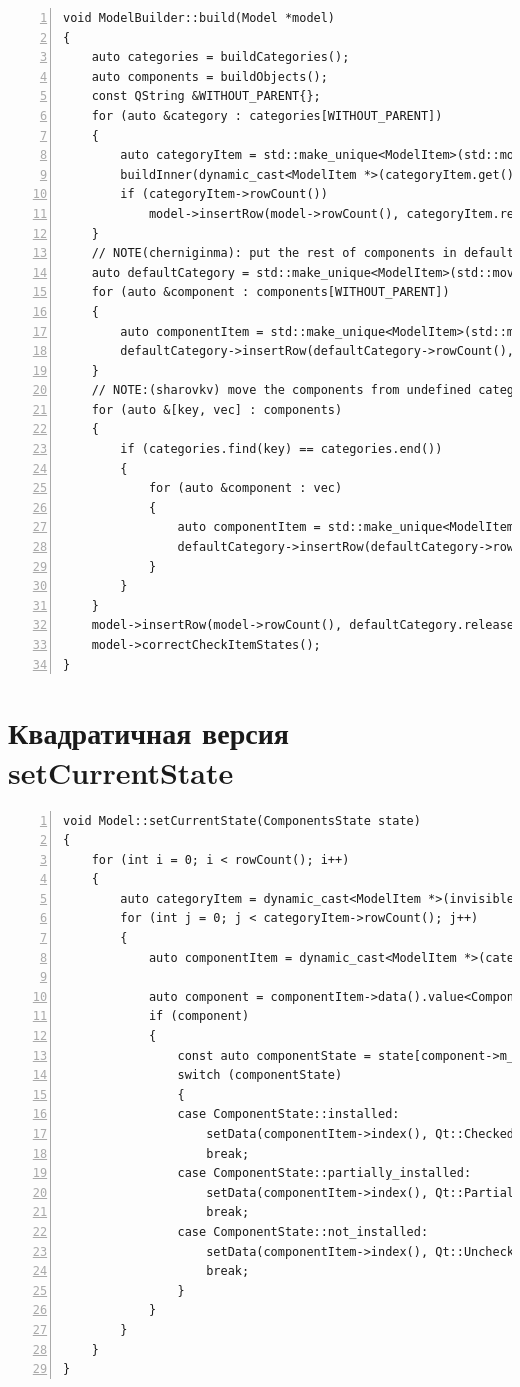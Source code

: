 \documentclass[bachelor, och, pract]{SCWorks}
\begin{document}
\begin{Verbatim}[fontsize=\small,breaklines=true,numbers=left]
void ModelBuilder::build(Model *model)
{
    auto categories = buildCategories();
    auto components = buildObjects();
    const QString &WITHOUT_PARENT{};
    for (auto &category : categories[WITHOUT_PARENT])
    {
        auto categoryItem = std::make_unique<ModelItem>(std::move(category));
        buildInner(dynamic_cast<ModelItem *>(categoryItem.get()), categories, components);
        if (categoryItem->rowCount())
            model->insertRow(model->rowCount(), categoryItem.release());
    }
    // NOTE(cherniginma): put the rest of components in default category
    auto defaultCategory = std::make_unique<ModelItem>(std::move(buildDefaultCategory()));
    for (auto &component : components[WITHOUT_PARENT])
    {
        auto componentItem = std::make_unique<ModelItem>(std::move(component));
        defaultCategory->insertRow(defaultCategory->rowCount(), componentItem.release());
    }
    // NOTE:(sharovkv) move the components from undefined categories to default category
    for (auto &[key, vec] : components)
    {
        if (categories.find(key) == categories.end())
        {
            for (auto &component : vec)
            {
                auto componentItem = std::make_unique<ModelItem>(std::move(component));
                defaultCategory->insertRow(defaultCategory->rowCount(), componentItem.release());
            }
        }
    }
    model->insertRow(model->rowCount(), defaultCategory.release());
    model->correctCheckItemStates();
}
\end{Verbatim}

\section{Квадратичная версия setCurrentState}\label{setcurrentstate}

\begin{Verbatim}[fontsize=\small,breaklines=true,numbers=left]
void Model::setCurrentState(ComponentsState state)
{
    for (int i = 0; i < rowCount(); i++)
    {
        auto categoryItem = dynamic_cast<ModelItem *>(invisibleRootItem()->child(i));
        for (int j = 0; j < categoryItem->rowCount(); j++)
        {
            auto componentItem = dynamic_cast<ModelItem *>(categoryItem->child(j));

            auto component = componentItem->data().value<ComponentObject *>();
            if (component)
            {
                const auto componentState = state[component->m_id];
                switch (componentState)
                {
                case ComponentState::installed:
                    setData(componentItem->index(), Qt::Checked, Qt::CheckStateRole);
                    break;
                case ComponentState::partially_installed:
                    setData(componentItem->index(), Qt::PartiallyChecked, Qt::CheckStateRole);
                    break;
                case ComponentState::not_installed:
                    setData(componentItem->index(), Qt::Unchecked, Qt::CheckStateRole);
                    break;
                }
            }
        }
    }
}
\end{Verbatim}
\end{document}
